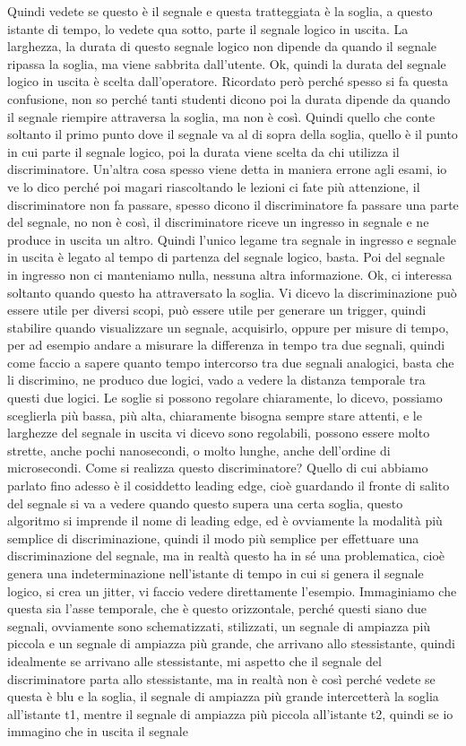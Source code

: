 Quindi vedete se questo è il segnale e questa tratteggiata è la soglia, a questo istante di tempo, lo vedete qua sotto, parte il segnale logico in uscita. La larghezza, la durata di questo segnale logico non dipende da quando il segnale ripassa la soglia, ma viene sabbrita dall'utente. Ok, quindi la durata del segnale logico in uscita è scelta dall'operatore. Ricordato però perché spesso si fa questa confusione, non so perché tanti studenti dicono poi la durata dipende da quando il segnale riempire attraversa la soglia, ma non è così. Quindi quello che conte soltanto il primo punto dove il segnale va al di sopra della soglia, quello è il punto in cui parte il segnale logico, poi la durata viene scelta da chi utilizza il discriminatore. Un'altra cosa spesso viene detta in maniera errone agli esami, io ve lo dico perché poi magari riascoltando le lezioni ci fate più attenzione, il discriminatore non fa passare, spesso dicono il discriminatore fa passare una parte del segnale, no non è così, il discriminatore riceve un ingresso in segnale e ne produce in uscita un altro. Quindi l'unico legame tra segnale in ingresso e segnale in uscita è legato al tempo di partenza del segnale logico, basta. Poi del segnale in ingresso non ci manteniamo nulla, nessuna altra informazione. Ok, ci interessa soltanto quando questo ha attraversato la soglia. Vi dicevo la discriminazione può essere utile per diversi scopi, può essere utile per generare un trigger, quindi stabilire quando visualizzare un segnale, acquisirlo, oppure per misure di tempo, per ad esempio andare a misurare la differenza in tempo tra due segnali, quindi come faccio a sapere quanto tempo intercorso tra due segnali analogici, basta che li discrimino, ne produco due logici, vado a vedere la distanza temporale tra questi due logici. Le soglie si possono regolare chiaramente, lo dicevo, possiamo sceglierla più bassa, più alta, chiaramente bisogna sempre stare attenti, e le larghezze del segnale in uscita vi dicevo sono regolabili, possono essere molto strette, anche pochi nanosecondi, o molto lunghe, anche dell'ordine di microsecondi. Come si realizza questo discriminatore? Quello di cui abbiamo parlato fino adesso è il cosiddetto leading edge, cioè guardando il fronte di salito del segnale si va a vedere quando questo supera una certa soglia, questo algoritmo si imprende il nome di leading edge, ed è ovviamente la modalità più semplice di discriminazione, quindi il modo più semplice per effettuare una discriminazione del segnale, ma in realtà questo ha in sé una problematica, cioè genera una indeterminazione nell'istante di tempo in cui si genera il segnale logico, si crea un jitter, vi faccio vedere direttamente l'esempio. Immaginiamo che questa sia l'asse temporale, che è questo orizzontale, perché questi siano due segnali, ovviamente sono schematizzati, stilizzati, un segnale di ampiazza più piccola e un segnale di ampiazza più grande, che arrivano allo stessistante, quindi idealmente se arrivano alle stessistante, mi aspetto che il segnale del discriminatore parta allo stessistante, ma in realtà non è così perché vedete se questa è blu e la soglia, il segnale di ampiazza più grande intercetterà la soglia all'istante t1, mentre il segnale di ampiazza più piccola all'istante t2, quindi se io immagino che in uscita il segnale 
